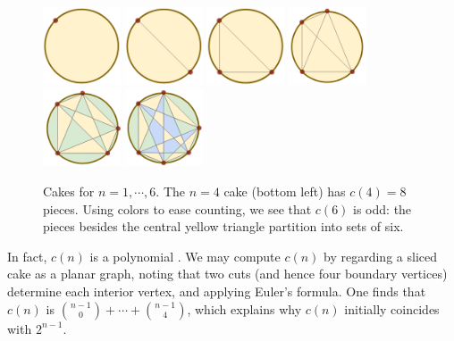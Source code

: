 \documentclass[twocolumn, 11pt]{article}
\theoremstyle{definition}
\begin{document}
        \begin{figure}[H]
            \centering
            \includegraphics[height=2.3cm]{cake-1}
            \includegraphics[height=2.3cm]{cake-2}
            \includegraphics[height=2.3cm]{cake-3}
            \includegraphics[height=2.3cm]{cake-4}
            \includegraphics[height=2.3cm]{cake-5-col}
            \includegraphics[height=2.3cm]{cake-6-col}
            \caption{{
                Cakes for $n=1,{\cdots}, 6$.
                The $n=4$ cake (bottom left) has $c(4)=8$ pieces.
                Using colors to ease counting,
                we see that $c(6)$ is odd: the pieces besides the
                central yellow triangle partition into sets of six.
            }}
        \end{figure}

        In fact, $c(n)$ is a polynomial \cite{wetzel}.  We may compute $c(n)$
        by regarding a sliced cake as a planar graph, noting that two cuts (and
        hence four boundary vertices) determine each interior vertex, and
        applying Euler's formula.  One finds that $c(n)$ is ${n-1 \choose
        0}+\cdots+{n-1\choose 4}$, which explains why $c(n)$ initially
        coincides with $2^{n-1}$.
\end{document}
